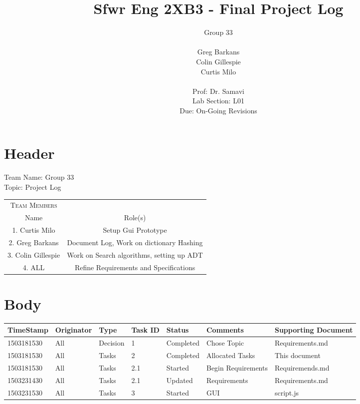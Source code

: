 \documentclass[10pt, oneside]{article}
\title{Sfwr Eng 2XB3 - Final Project Log}
\author{
	Group 33   \\ \\ 
	Greg Barkans \\
	Colin Gillespie \\
	Curtis Milo \\
	 \vspace{2cm} \\
	Prof: Dr. Samavi \\
	Lab Section: L01 \\
	Due: On-Going Revisions \\	
}
\date{}
\begin{document}
\maketitle
\newpage


\section{Header}
Team Name: Group 33 \\
Topic: Project Log

\vspace{1cm}

\begin{tabular}{c|c}

	\textsc{Team Members} & \\
	Name & Role(s) \\
	\hline
	1. Curtis Milo & Setup Gui Prototype \\
	2. Greg Barkans & Document Log, Work on dictionary Hashing \\
	3. Colin Gillespie & Work on Search algorithms, setting up ADT \\
	4. ALL & Refine Requirements and Specifications 
\end{tabular}



\section{Body}

\setlength{\tabcolsep}{5pt}
\begin{tabular}{p{2cm}|p{1.75cm}|p{1.25cm}|p{1cm}|p{2cm}|p{3cm}|p{2cm}}

	\hline
	TimeStamp & Originator & Type & Task ID & Status & Comments & Supporting Document \\
	\hline
	1503181530 & All & Decision & 1 & Completed & Chose Topic & Requirements.md \\
	\hline
	1503181530 & All & Tasks & 2 & Completed & Allocated Tasks & This document \\
	\hline
	1503181530 & All & Tasks & 2.1 & Started & Begin Requirements & Requiremends.md \\
	1503231430 & All & Tasks & 2.1 & Updated & Requirements & Requirements.md \\
	1503231530 & All & Tasks & 3 & Started & GUI & script.js \\
\end{tabular}
\end{document}
